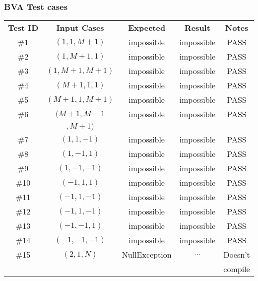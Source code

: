 \subsubsection{BVA Test cases}
\begin{center}
  \begin{tabular}{ccccc}
    \textbf{Test ID} & \textbf{Input Cases} & \textbf{Expected} & \textbf{Result} & \textbf{Notes} \\
    \#1 & $(1,1,M+1)$   & impossible    & impossible  & PASS \\
    \#2 & $(1,M+1,1)$   & impossible    & impossible  & PASS \\
    \#3 & $(1,M+1,M+1)$ & impossible    & impossible  & PASS \\
    \#4 & $(M+1,1,1)$   & impossible    & impossible  & PASS \\
    \#5 & $(M+1,1,M+1)$ & impossible    & impossible  & PASS \\
    \#6 & $(M+1,M+1$    & impossible    & impossible  & PASS \\
         & $,M+1)$ \\
    \#7 & $(1,1,-1)$    & impossible    & impossible  & PASS \\
    \#8 & $(1,-1,1)$    & impossible    & impossible  & PASS \\
    \#9 & $(1,-1,-1)$   & impossible    & impossible  & PASS \\
    \#10 & $(-1,1,1)$    & impossible    & impossible  & PASS \\
    \#11 & $(-1,1,-1)$   & impossible    & impossible  & PASS \\
    \#12 & $(-1,1,-1)$   & impossible    & impossible  & PASS \\
    \#13 & $(-1,-1,1)$   & impossible    & impossible  & PASS \\
    \#14 & $(-1,-1,-1)$  & impossible    & impossible  & PASS \\
    \#15 & $(2,1,N)$     & NullException & $\dots$     & Doesn't \\
         &               &               &             & compile \\
  \end{tabular}
\end{center}


